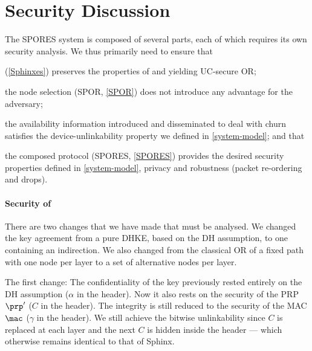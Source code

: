 \section{Security Discussion}%
\label{security-discussion}



The \ac{SPORES} system is composed of several parts, each of which requires its 
own security analysis.
We thus primarily need to ensure that
\begin{enumerate*}
\item \Sphinxes (\cref{Sphinxes}) preserves the properties of 
  \textcite{CLOnionRouting} and \textcite{Sphinx} yielding \ac{UC}-secure 
  \ac{OR};
\item the node selection (\ac{SPOR}, \cref{SPOR}) does not introduce any 
  advantage for the adversary;
\item the availability information introduced and disseminated to deal with 
  churn satisfies the device-unlinkability property we defined in 
  \cref{system-model}; and that
\item the composed protocol (\ac{SPORES}, \cref{SPORES}) provides the desired 
  security properties defined in \cref{system-model}, \ie
  privacy and robustness (packet re-ordering and drops).
\end{enumerate*}

\paragraph*{Security of \Sphinxes}

There are two changes that we have made that must be analysed.
We changed the key agreement from a pure \ac{DHKE}, \ie based on the \ac{DH} 
assumption, to one containing an indirection.
We also changed from the classical \ac{OR} of a fixed path with one node per 
layer to a set of alternative nodes per layer.

The first change:
The confidentiality of the key previously rested entirely on the \ac{DH} 
assumption (\(\alpha\) in the header).
Now it also rests on the security of the \ac{PRP} \(\prp'\) (\(C\) in the 
header).
The integrity is still reduced to the security of the \ac{MAC} \(\mac\) 
(\(\gamma\) in the header).
We still achieve the bitwise unlinkability since \(C\) is replaced at each 
layer and the next \(C\) is hidden inside the header --- which otherwise 
remains identical to that of Sphinx.

